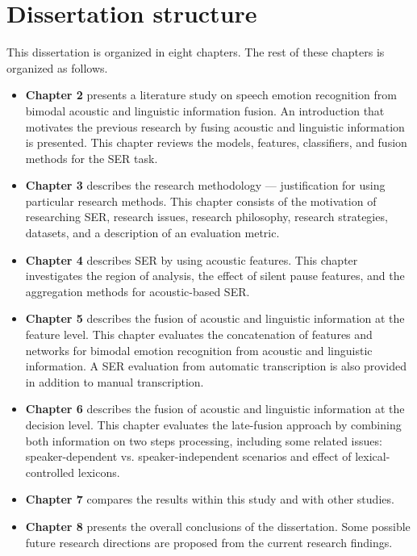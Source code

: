\section{Dissertation structure}
This dissertation is organized in eight chapters. The rest of these chapters is
organized as follows.
\begin{itemize}
\item \textbf{Chapter 2} presents a literature study on speech emotion
recognition from bimodal acoustic and linguistic information fusion. An
introduction that motivates the previous research by fusing acoustic and
linguistic information is presented. This chapter reviews the models, features,
classifiers, and fusion methods for the SER task.
\item \textbf{Chapter 3} describes the research methodology --- justification
for using particular research methods. This chapter consists of the motivation
of researching SER, research issues, research philosophy, research strategies,
datasets, and a description of an evaluation metric. 
\item \textbf{Chapter 4} describes SER by using acoustic features. This chapter
investigates the region of analysis, the effect of silent pause features, and
the aggregation methods for acoustic-based SER.
\item \textbf{Chapter 5} describes the fusion of acoustic and linguistic
information at the feature level. This chapter evaluates the concatenation of
features and networks for bimodal emotion recognition from acoustic and
linguistic information. A SER evaluation from automatic transcription is also
provided in addition to manual transcription.
\item \textbf{Chapter 6} describes the fusion of acoustic and linguistic
information at the decision level. This chapter evaluates the late-fusion
approach by combining both information on two steps processing, including some
related issues: speaker-dependent vs. speaker-independent scenarios and effect
of lexical-controlled lexicons.
\item \textbf{Chapter 7} compares the results within this study and with other
studies. 
\item \textbf{Chapter 8} presents the overall conclusions of the dissertation.
Some possible future research directions are proposed from the current research
findings.
\end{itemize}

